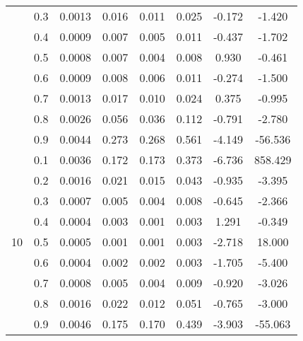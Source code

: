 \documentclass[11pt,a4paper]{report}
\begin{document}
\begin{longtable}{ | c | c || c | c | c | c | c | c | }
 & 0.3 & 0.0013 & 0.016 & 0.011 & 0.025 & -0.172 & -1.420 \\
 & 0.4 & 0.0009 & 0.007 & 0.005 & 0.011 & -0.437 & -1.702 \\
 & 0.5 & 0.0008 & 0.007 & 0.004 & 0.008 & 0.930 & -0.461 \\
 & 0.6 & 0.0009 & 0.008 & 0.006 & 0.011 & -0.274 & -1.500 \\
 & 0.7 & 0.0013 & 0.017 & 0.010 & 0.024 & 0.375 & -0.995 \\
 & 0.8 & 0.0026 & 0.056 & 0.036 & 0.112 & -0.791 & -2.780 \\
 & 0.9 & 0.0044 & 0.273 & 0.268 & 0.561 & -4.149 & -56.536 \\
 \hline
\multirow{9}{*}{10} & 0.1 & 0.0036 & 0.172 & 0.173 & 0.373 & -6.736 & 858.429 \\
 & 0.2 & 0.0016 & 0.021 & 0.015 & 0.043 & -0.935 & -3.395 \\
 & 0.3 & 0.0007 & 0.005 & 0.004 & 0.008 & -0.645 & -2.366 \\
 & 0.4 & 0.0004 & 0.003 & 0.001 & 0.003 & 1.291 & -0.349 \\
 & 0.5 & 0.0005 & 0.001 & 0.001 & 0.003 & -2.718 & 18.000 \\
 & 0.6 & 0.0004 & 0.002 & 0.002 & 0.003 & -1.705 & -5.400 \\
 & 0.7 & 0.0008 & 0.005 & 0.004 & 0.009 & -0.920 & -3.026 \\
 & 0.8 & 0.0016 & 0.022 & 0.012 & 0.051 & -0.765 & -3.000 \\
 & 0.9 & 0.0046 & 0.175 & 0.170 & 0.439 & -3.903 & -55.063 \\
 \hline
\hline
\end{longtable}
\end{document}
